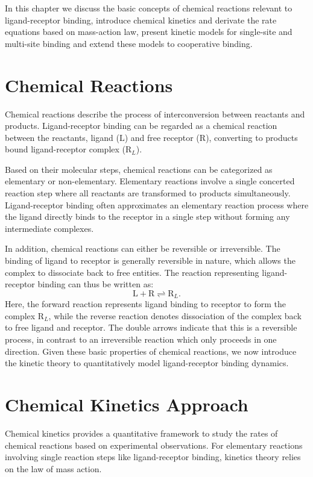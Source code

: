 In this chapter we discuss the basic concepts of chemical reactions relevant to ligand-receptor binding, introduce chemical kinetics and derivate the rate equations based on mass-action law, present kinetic models for single-site and multi-site binding and extend these models to cooperative binding.

\section{Chemical Reactions}

Chemical reactions describe the process of interconversion between reactants and products. Ligand-receptor binding can be regarded as a chemical reaction between the reactants, ligand ($\text{L}$) and free receptor ($\text{R}$), converting to products bound ligand-receptor complex ($\text{R}_L$). 

Based on their molecular steps, chemical reactions can be categorized as elementary or non-elementary. Elementary reactions involve a single concerted reaction step where all reactants are transformed to products simultaneously. Ligand-receptor binding often approximates an elementary reaction process where the ligand directly binds to the receptor in a single step without forming any intermediate complexes.

In addition, chemical reactions can either be reversible or irreversible. The binding of ligand to receptor is generally reversible in nature, which allows the complex to dissociate back to free entities. The reaction representing ligand-receptor binding can thus be written as:
\begin{equation}
	\text{L} + \text{R} \rightleftharpoons \text{R}_L.
\label{eq:24.01}
\end{equation}
Here, the forward reaction represents ligand binding to receptor to form the complex $\text{R}_L$, while the reverse reaction denotes dissociation of the complex back to free ligand and receptor. The double arrows indicate that this is a reversible process, in contrast to an irreversible reaction which only proceeds in one direction. Given these basic properties of chemical reactions, we now introduce the kinetic theory to quantitatively model ligand-receptor binding dynamics.

\section{Chemical Kinetics Approach}

Chemical kinetics provides a quantitative framework to study the rates of chemical reactions based on experimental observations. For elementary reactions involving single reaction steps like ligand-receptor binding, kinetics theory relies on the law of mass action.

